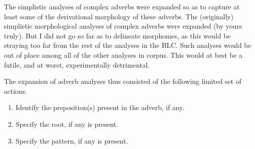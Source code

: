 


%

The simplistic analyses of complex adverbs were expanded so as to capture at 
least some of the derivational morphology of these adverbs. %
The (originally) simplistic morphological analyses of complex adverbs were expanded 
(by yours truly). 
But I did not go so far as to delineate morphomes, as this would 
be straying too far from the rest of the analyses in the BLC. Such 
analyses would be out of place among all of the other analyses in corpus. 
This would at best be a futile, and at worst, experimentally detrimental.

The expansion of adverb analyses thus consisted of the following limited set of actions. 
\begin{enumerate}
\item Identify the preposition(s) present in the adverb, if any.
\item Specify the root, if any is present.
\item Specify the pattern, if any is present.
\end{enumerate}

